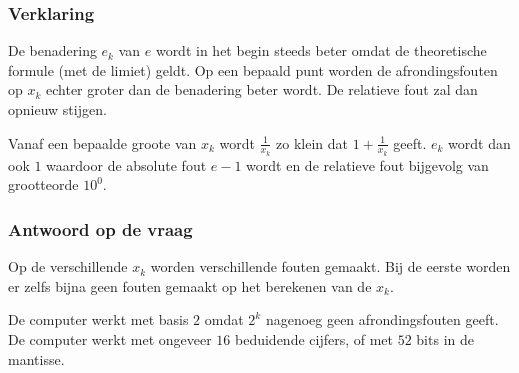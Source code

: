 \documentclass[examenvragen.tex]{subfiles}
\begin{document}
\subsubsection{Verklaring}
De benadering $e_k$ van $e$ wordt in het begin steeds beter omdat de theoretische formule (met de limiet) geldt. Op een bepaald punt worden de afrondingsfouten op $x_k$ echter groter dan de benadering beter wordt. De relatieve fout zal dan opnieuw stijgen.

Vanaf een bepaalde groote van $x_k$ wordt $\frac{1}{x_k}$ zo klein dat $1 + \frac{1}{x_k}$ geeft. $e_k$ wordt dan ook $1$ waardoor de absolute fout $e - 1$ wordt en de relatieve fout bijgevolg van grootteorde $10^{0}$.

\subsubsection{Antwoord op de vraag}
Op de verschillende $x_k$ worden verschillende fouten gemaakt. Bij de eerste worden er zelfs bijna geen fouten gemaakt op het berekenen van de $x_k$.

De computer werkt met basis $2$ omdat $2^k$ nagenoeg geen afrondingsfouten geeft. De computer werkt met ongeveer $16$ beduidende cijfers, of met $52$ bits in de mantisse.
\end{document}
